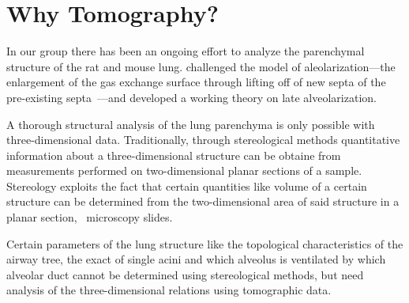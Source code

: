 \section{Why Tomography?}
In our group there has been an ongoing effort to analyze the parenchymal structure of the rat and mouse lung. \citet{Mund2008} challenged the model of aleolarization---the enlargement of the gas exchange surface through lifting off of new septa of the pre-existing septa~\cite{Burri1974}---and developed a working theory on late alveolarization. 

A thorough structural analysis of the lung parenchyma is only possible with three-dimensional data. Traditionally, through stereological methods quantitative information about a three-dimensional structure can be obtaine from measurements performed on two-dimensional planar sections of a sample. Stereology exploits the fact that certain quantities like volume of a certain structure can be determined from the two-dimensional area of said structure in a planar section, \eg\ microscopy slides.

Certain parameters of the lung structure like the topological characteristics of the airway tree, the exact of single acini and which alveolus is ventilated by which alveolar duct cannot be determined using stereological methods, but need analysis of the three-dimensional relations using tomographic data.